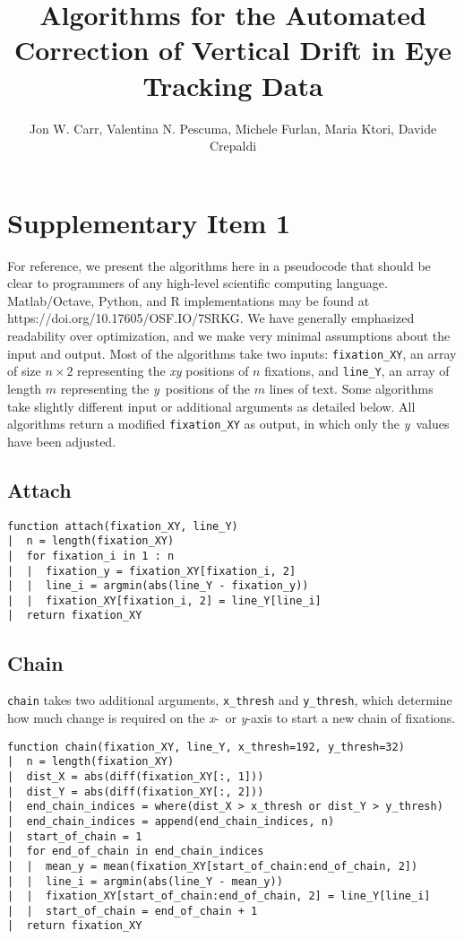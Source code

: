 \documentclass[doc,biblatex]{apa7}
\title{Algorithms for the Automated Correction of Vertical Drift in Eye Tracking Data}
\author{Jon W. Carr, Valentina N. Pescuma, Michele Furlan, Maria Ktori, Davide Crepaldi}
\affiliation{Cognitive Neuroscience, International School for Advanced Studies, Trieste, Italy}
\begin{document}
\maketitle

\section{Supplementary Item 1}

\noindent
For reference, we present the algorithms here in a pseudocode that should be clear to programmers of any high-level scientific computing language. Matlab/Octave, Python, and R implementations may be found at https://doi.org/10.17605/OSF.IO/7SRKG. We have generally emphasized readability over optimization, and we make very minimal assumptions about the input and output. Most of the algorithms take two inputs: \texttt{fixation\_XY}, an array of size $n \times 2$ representing the \textit{xy} positions of $n$ fixations, and \texttt{line\_Y}, an array of length $m$ representing the \textit{y}~positions of the $m$ lines of text. Some algorithms take slightly different input or additional arguments as detailed below. All algorithms return a modified \texttt{fixation\_XY} as output, in which only the \textit{y}~values have been adjusted.

\subsection{Attach}

\begin{verbatim}
function attach(fixation_XY, line_Y)
|  n = length(fixation_XY)
|  for fixation_i in 1 : n
|  |  fixation_y = fixation_XY[fixation_i, 2]
|  |  line_i = argmin(abs(line_Y - fixation_y))
|  |  fixation_XY[fixation_i, 2] = line_Y[line_i]
|  return fixation_XY
\end{verbatim}

\subsection{Chain}

\noindent
\texttt{chain} takes two additional arguments, \texttt{x\_thresh} and \texttt{y\_thresh}, which determine how much change is required on the \textit{x}-~or \textit{y}-axis to start a new chain of fixations.

\begin{verbatim}
function chain(fixation_XY, line_Y, x_thresh=192, y_thresh=32)
|  n = length(fixation_XY)
|  dist_X = abs(diff(fixation_XY[:, 1]))
|  dist_Y = abs(diff(fixation_XY[:, 2]))
|  end_chain_indices = where(dist_X > x_thresh or dist_Y > y_thresh)
|  end_chain_indices = append(end_chain_indices, n)
|  start_of_chain = 1
|  for end_of_chain in end_chain_indices
|  |  mean_y = mean(fixation_XY[start_of_chain:end_of_chain, 2])
|  |  line_i = argmin(abs(line_Y - mean_y))
|  |  fixation_XY[start_of_chain:end_of_chain, 2] = line_Y[line_i]
|  |  start_of_chain = end_of_chain + 1
|  return fixation_XY
\end{verbatim}
\end{document}
